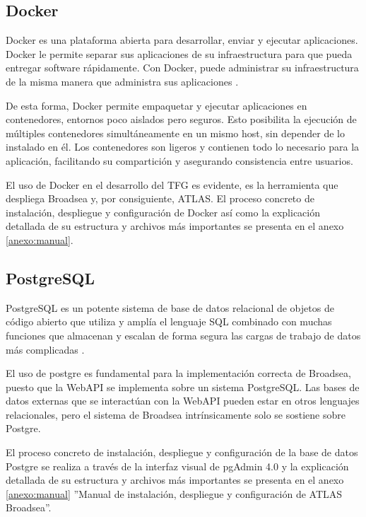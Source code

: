 {\subsection{Docker}

Docker es una plataforma abierta para desarrollar, enviar y ejecutar aplicaciones. Docker le permite separar sus aplicaciones de su infraestructura para que pueda entregar software rápidamente. Con Docker, puede administrar su infraestructura de la misma manera que administra sus aplicaciones \cite{DockerWebsite}.

De esta forma, Docker permite empaquetar y ejecutar aplicaciones en contenedores, entornos poco aislados pero seguros. Esto posibilita la ejecución de múltiples contenedores simultáneamente en un mismo host, sin depender de lo instalado en él. Los contenedores son ligeros y contienen todo lo necesario para la aplicación, facilitando su compartición y asegurando consistencia entre usuarios. 

El uso de Docker en el desarrollo del TFG es evidente, es la herramienta que despliega Broadsea y, por consiguiente, ATLAS. El proceso concreto de instalación, despliegue y configuración de Docker así como la explicación detallada de su estructura y archivos más importantes se presenta en el anexo \ref{anexo:manual}.

\subsection{PostgreSQL}

PostgreSQL es un potente sistema de base de datos relacional de objetos de código abierto que utiliza y amplía el lenguaje SQL combinado con muchas funciones que almacenan y escalan de forma segura las cargas de trabajo de datos más complicadas \cite{PostgreWebsite}.

El uso de postgre es fundamental para la implementación correcta de Broadsea, puesto que la WebAPI se implementa sobre un sistema PostgreSQL. Las bases de datos externas que se interactúan con la WebAPI pueden estar en otros lenguajes relacionales, pero el sistema de Broadsea intrínsicamente solo se sostiene sobre Postgre.

El proceso concreto de instalación, despliegue y configuración de la base de datos Postgre se realiza a través de la interfaz visual de pgAdmin 4.0 \cite{pgAdminWebsite} y la explicación detallada de su estructura y archivos más importantes se presenta en el anexo \ref{anexo:manual} ''Manual de instalación, despliegue y configuración de ATLAS Broadsea''.

}
